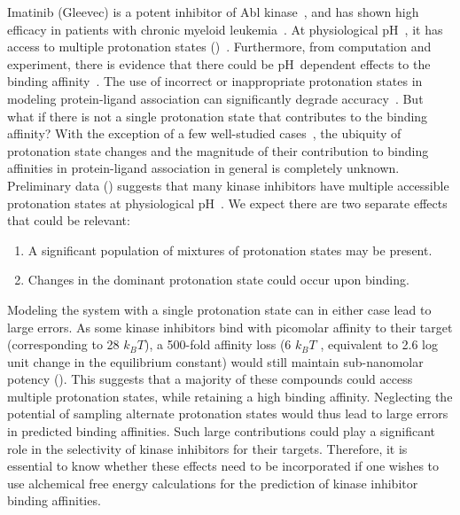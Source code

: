 \documentclass[10pt,final]{article}
\newcommand{\pH}{p$\mathrm{H}$\ }
\begin{document}
Imatinib (Gleevec) is a potent inhibitor of Abl kinase~\autocite{Druker2001a}, and has shown high efficacy in patients with chronic myeloid leukemia~\autocite{OBrien2003a}.
%
At physiological \pH, it has access to multiple protonation states ()~\autocite{Szakacs2005a}.
%
Furthermore, from computation and experiment, there is evidence that there could be \pH dependent effects to the binding affinity~\autocite{Seeliger2007a,Lin2013a}.
%
The use of incorrect or inappropriate protonation states in modeling protein-ligand association can significantly degrade accuracy~\autocite{Polgar2005a,Wittayanarakul2008a}.
%
But what if there is not a single protonation state that contributes to the binding affinity?
%
With the exception of a few well-studied cases~\autocite{Dullweber2001a,Aleksandrov2007a,Czodrowski2007a,Steuber2007a,Czodrowski2007b}, 
the ubiquity of protonation state changes and the magnitude of their contribution to binding affinities in protein-ligand association in general is completely unknown. 
%
Preliminary data () suggests that many kinase inhibitors have multiple accessible protonation states at physiological \pH.
%
We expect there are two separate effects that could be relevant:
\begin{enumerate}
 \item A significant population of mixtures of protonation states may be present.
 \item Changes in the dominant protonation state could occur upon binding.
\end{enumerate}
%
Modeling the system with a single protonation state can in either case lead to large errors.
%
As some kinase inhibitors bind with picomolar affinity to their target (corresponding to 28 $k_BT$), a 500-fold affinity loss (6 $k_BT$ , equivalent to 2.6 log unit change in the equilibrium constant) would still maintain sub-nanomolar potency ().
%
This suggests that a majority of these compounds could access multiple protonation states, while retaining a high binding affinity.
%
Neglecting the potential of sampling alternate protonation states would thus lead to large errors in predicted binding affinities.
%
Such large contributions could play a significant role in the selectivity of kinase inhibitors for their targets.
%
Therefore, it is essential to know whether these effects need to be incorporated if one wishes to use alchemical free energy calculations for the prediction of kinase inhibitor binding affinities.
\end{document}
